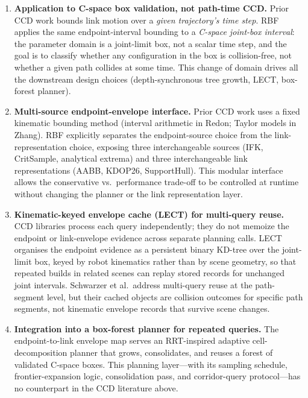\documentclass[11pt,a4paper]{article}
\begin{document}
\begin{enumerate}
  \item \textbf{Application to C-space box validation, not path-time CCD.}
        Prior CCD work bounds link motion over a \emph{given trajectory's time
        step}.  RBF applies the same endpoint-interval bounding to a \emph{C-space
        joint-box interval}: the parameter domain is a joint-limit box, not a
        scalar time step, and the goal is to classify whether any configuration
        in the box is collision-free, not whether a given path collides at some
        time.  This change of domain drives all the downstream design choices
        (depth-synchronous tree growth, LECT, box-forest planner).

  \item \textbf{Multi-source endpoint-envelope interface.}
        Prior CCD work uses a fixed kinematic bounding method (interval
        arithmetic in Redon; Taylor models in Zhang).  RBF explicitly separates
        the endpoint-source choice from the link-representation choice, exposing
        three interchangeable sources (IFK, CritSample, analytical extrema) and
        three interchangeable link representations (AABB, KDOP26, SupportHull).
        This modular interface allows the conservative vs.\ performance trade-off
        to be controlled at runtime without changing the planner or the link
        representation layer.

  \item \textbf{Kinematic-keyed envelope cache (LECT) for multi-query reuse.}
        CCD libraries process each query independently; they do not memoize the
        endpoint or link-envelope evidence across separate planning calls.  LECT
        organises the endpoint evidence as a persistent binary KD-tree over the
        joint-limit box, keyed by robot kinematics rather than by scene geometry,
        so that repeated builds in related scenes can replay stored records for
        unchanged joint intervals.  Schwarzer et al.\ address multi-query reuse
        at the path-segment level, but their cached objects are collision outcomes
        for specific path segments, not kinematic envelope records that survive
        scene changes.

  \item \textbf{Integration into a box-forest planner for repeated queries.}
        The endpoint-to-link envelope map serves an RRT-inspired adaptive
        cell-decomposition planner that grows, consolidates, and reuses a forest
        of validated C-space boxes.  This planning layer---with its sampling
        schedule, frontier-expansion logic, consolidation pass, and corridor-query
        protocol---has no counterpart in the CCD literature above.
\end{enumerate}
\end{document}
